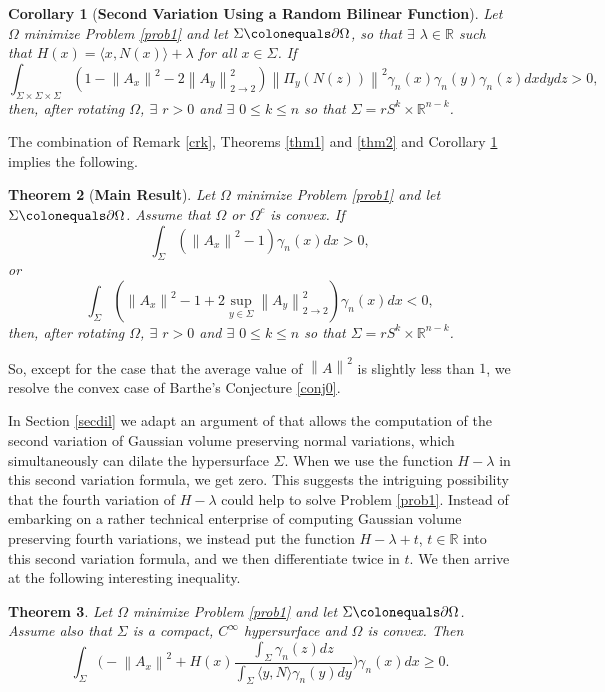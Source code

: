 \documentclass[12pt,reqno]{amsart}
\newtheorem{theorem}{Theorem}[section]
\newtheorem{cor}[theorem]{Corollary}
\theoremstyle{definition}
\newcommand{\vnorm}[1]{\left\|#1\right\|}    %
\newcommand{\vnormt}[1]{\left\|#1\right\|}    %
\newcommand{\R}{\mathbb{R}}
\newcommand{\embolden}[1]{\textbf {#1}}
\newcommand{\sdimn}{n}
\newcommand{\scon}{\lambda}
\begin{document}
\begin{cor}[\embolden{Second Variation Using a Random Bilinear Function}]\label{cor2}
Let $\Omega$ minimize Problem \ref{prob1} and let $\Sigma\colonequals\partial\Omega$, so that $\exists$ $\scon\in\R$ such that $H(x)=\langle x,N(x)\rangle+\scon$ for all $x\in\Sigma$.  If
$$
\int_{\Sigma\times\Sigma\times\Sigma}(1-\vnormt{A_{x}}^{2}-2\vnorm{A_{y}}_{2\to2}^{2})\vnormt{\Pi_{y}(N(z))}^{2}
\gamma_{\sdimn}(x)\gamma_{\sdimn}(y)\gamma_{\sdimn}(z)dxdydz>0,$$
then, after rotating $\Omega$, $\exists$ $r>0$ and $\exists$ $0\leq k\leq \sdimn$ so that $\Sigma=r S^{k}\times\R^{\sdimn-k}$.
\end{cor}

The combination of Remark \ref{crk}, Theorems \ref{thm1} and \ref{thm2} and Corollary \ref{cor2} implies the following.

\begin{theorem}[\embolden{Main Result}]\label{mainthm}
Let $\Omega$ minimize Problem \ref{prob1} and let $\Sigma\colonequals\partial\Omega$.  Assume that $\Omega$ or $\Omega^{c}$ is convex.  If
$$\int_{\Sigma}(\vnormt{A_{x}}^{2}-1)\gamma_{\sdimn}(x)dx>0,$$
or
$$\int_{\Sigma}(\vnormt{A_{x}}^{2}-1+2\sup_{y\in\Sigma}\vnormt{A_{y}}_{2\to 2}^{2})\gamma_{\sdimn}(x)dx<0,$$
then, after rotating $\Omega$, $\exists$ $r>0$ and $\exists$ $0\leq k\leq \sdimn$ so that $\Sigma=r S^{k}\times\R^{\sdimn-k}$.
\end{theorem}
So, except for the case that the average value of $\vnormt{A}^{2}$ is slightly less than $1$, we resolve the convex case of Barthe's Conjecture \ref{conj0}.

In Section \ref{secdil} we adapt an argument of \cite{colding12a} that allows the computation of the second variation of Gaussian volume preserving normal variations, which simultaneously can dilate the hypersurface $\Sigma$.  When we use the function $H-\scon$ in this second variation formula, we get zero.  This suggests the intriguing possibility that the fourth variation of $H-\scon$ could help to solve Problem \ref{prob1}.  Instead of embarking on a rather technical enterprise of computing Gaussian volume preserving fourth variations, we instead put the function $H-\scon+t$, $t\in\R$ into this second variation formula, and we then differentiate twice in $t$.  We then arrive at the following interesting inequality.

\begin{theorem}\label{lastthm}
Let $\Omega$ minimize Problem \ref{prob1} and let $\Sigma\colonequals\partial\Omega$.  Assume also that $\Sigma$ is a compact, $C^{\infty}$ hypersurface and $\Omega$ is convex.  Then
$$
\int_{\Sigma}\Big(-\vnormt{A_{x}}^{2}
+H(x)\frac{\int_{\Sigma}\gamma_{\sdimn}(z)dz}{\int_{\Sigma}\langle y,N\rangle\gamma_{\sdimn}(y)dy}
\Big)\gamma_{\sdimn}(x)dx\geq0.
$$
\end{theorem}
\end{document}
